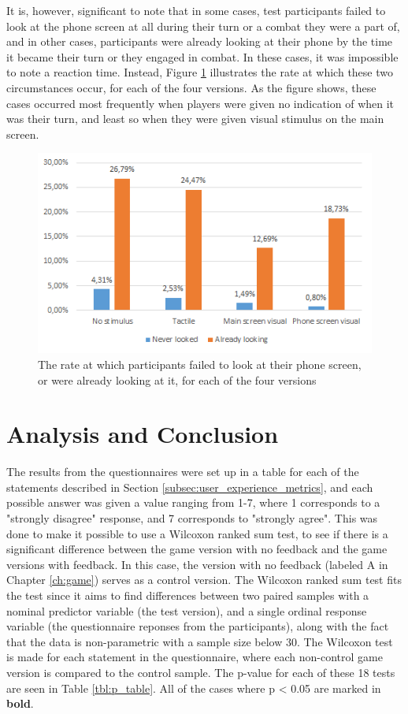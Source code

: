 It is, however, significant to note that in some cases, test participants failed to look at the phone screen at all during their turn or a combat they were a part of, and in other cases, participants were already looking at their phone by the time it became their turn or they engaged in combat. In these cases, it was impossible to note a reaction time. Instead, Figure \ref{fig:looked} illustrates the rate at which these two circumstances occur, for each of the four versions. As the figure shows, these cases occurred most frequently when players were given no indication of when it was their turn, and least so when they were given visual stimulus on the main screen. 

\begin{figure}[h!]
	\centering
	\includegraphics[scale=1]{figures/graph_looked.png}
	\caption{The rate at which participants failed to look at their phone screen, or were already looking at it, for each of the four versions}\label{fig:looked}
\end{figure}

\section{Analysis and Conclusion}
The results from the questionnaires were set up in a table for each of the statements described in Section \ref{subsec:user_experience_metrics}, and each possible answer was given a value ranging from 1-7, where 1 corresponds to a "strongly disagree" response, and 7 corresponds to "strongly agree". This was done to make it possible to use a Wilcoxon ranked sum test, to see if there is a significant difference between the game version with no feedback and the game versions with feedback. In this case, the version with no feedback (labeled A in Chapter \ref{ch:game}) serves as a control version. The Wilcoxon ranked sum test fits the test since it aims to find differences between two paired samples with a nominal predictor variable (the test version), and a single ordinal response variable (the questionnaire reponses from the participants), along with the fact that the data is non-parametric with a sample size below 30. The Wilcoxon test is made for each statement in the questionnaire, where each non-control game version is compared to the control sample. The p-value for each of these 18 tests are seen in Table \ref{tbl:p_table}. All of the cases where p < 0.05 are marked in \textbf{bold}.
 

